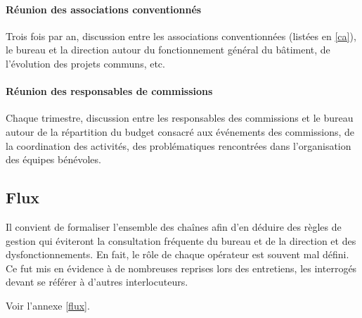\paragraph{Réunion des associations conventionnés} Trois fois par an,
discussion entre les associations conventionnées (listées en \ref{ca}),
le bureau et la direction autour du fonctionnement général du bâtiment,
de l'évolution des projets communs, etc.

\paragraph{Réunion des responsables de commissions} Chaque trimestre,
discussion entre les responsables des commissions et le bureau
autour de la répartition du budget consacré aux événements des commissions,
de la coordination des activités, des problématiques rencontrées dans
l'organisation des équipes bénévoles.

\subsection{Flux}

Il convient de formaliser l'ensemble des chaînes afin d'en déduire des règles
de gestion qui éviteront la consultation fréquente du bureau et de la direction
et des dysfonctionnements. En fait, le rôle de chaque opérateur est souvent
mal défini. Ce fut mis en évidence à de nombreuses reprises lors des entretiens,
les interrogés devant se référer à d'autres interlocuteurs.

Voir l'annexe \ref{flux}.